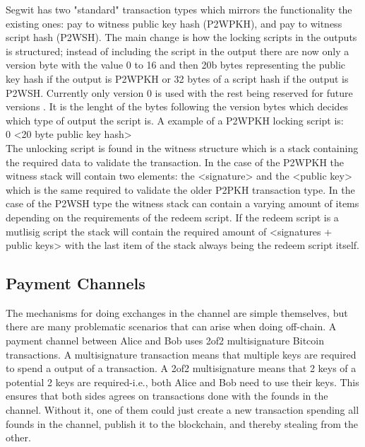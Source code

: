 Segwit has two "standard" transaction types which mirrors the functionality the existing ones: pay to witness public key hash (P2WPKH), and pay to witness script hash (P2WSH). The main change is how the locking scripts in the outputs is structured; instead of including the script in the output there are now only a version byte with the value 0 to 16 and then 20b bytes representing the public key hash if the output is P2WPKH or 32 bytes of a script hash if the output is P2WSH. Currently only version 0 is used with the rest being reserved for future versions \cite{BIP141}. It is the lenght of the bytes following the version bytes which decides which type of output the script is. A example of a P2WPKH locking script is:
\\

0 <20 byte public key hash>
\\

The unlocking script is found in the witness structure which is a stack containing the required data to validate the transaction.
In the case of the P2WPKH the witness stack will contain two elements: the <signature> and the <public key> which is the same required to validate the older P2PKH transaction type. In the case of the P2WSH type the witness stack can contain a varying amount of items depending on the requirements of the redeem script. If the redeem script is a mutlisig script the stack will contain the required amount of <signatures + public keys> with the last item of the stack always being the redeem script itself.

\subsection{Payment Channels}


The mechanisms for doing exchanges in the channel are simple themselves, but there are many problematic scenarios that can arise when doing off-chain.
A payment channel between Alice and Bob uses 2of2 multisignature Bitcoin transactions. A multisignature transaction means that multiple keys are required to spend a output of a transaction. A 2of2 multisignature means that 2 keys of a potential 2 keys are required-i.e., both Alice and Bob need to use their keys. This ensures that both sides agrees on transactions done with the founds in the channel. Without it, one of them could just create a new transaction spending all founds in the channel, publish it to the blockchain, and thereby stealing from the other.

